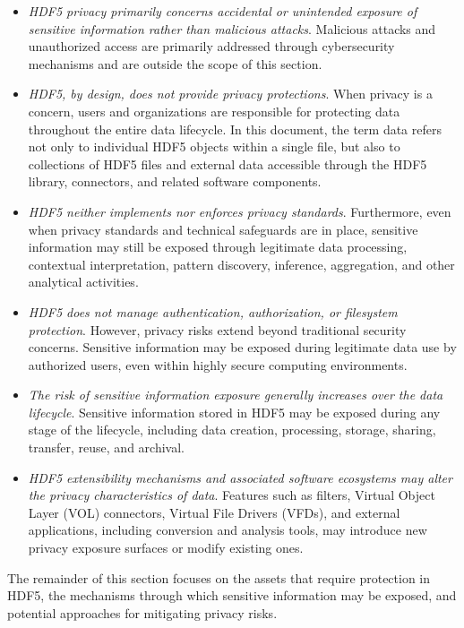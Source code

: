 \documentclass[../main.tex]{subfiles}
\begin{document}
\begin{itemize}
    \item \emph{HDF5 privacy primarily concerns accidental or unintended exposure of sensitive information
          rather than malicious attacks}. Malicious attacks and unauthorized access are primarily
          addressed through cybersecurity mechanisms and are outside the scope of this section.
    \item \emph{HDF5, by design, does not provide privacy protections}. When privacy is a concern, users and organizations
           are responsible for protecting data throughout the entire data lifecycle. In this document,
           the term data refers not only to individual HDF5 objects within a single file, but also to
           collections of HDF5 files and external data accessible through the HDF5 library,
           connectors, and related software components.
    \item \emph{HDF5 neither implements nor enforces privacy standards}. Furthermore, even when privacy
          standards and technical safeguards are in place, sensitive information may still be exposed
          through legitimate data processing, contextual interpretation, pattern discovery, inference,
          aggregation, and other analytical activities.
    \item \emph{HDF5 does not manage authentication, authorization, or filesystem protection}. However, privacy
          risks extend beyond traditional security concerns. Sensitive information may be exposed during
          legitimate data use by authorized users, even within highly secure computing environments.
    \item \emph{The risk of sensitive information exposure generally increases over the data lifecycle}.
          Sensitive information stored in HDF5 may be exposed during any stage of the lifecycle,
          including data creation, processing, storage, sharing, transfer, reuse, and archival.
    \item \emph{HDF5 extensibility mechanisms and associated software ecosystems may alter the privacy characteristics of data}.
          Features such as filters, Virtual Object Layer (VOL) connectors, Virtual File Drivers (VFDs), and
          external applications, including conversion and analysis tools, may introduce new privacy
          exposure surfaces or modify existing ones.
\end{itemize}

The remainder of this section focuses on the assets that require protection in HDF5, the mechanisms
through which sensitive information may be exposed, and potential approaches for mitigating privacy risks.
\end{document}
